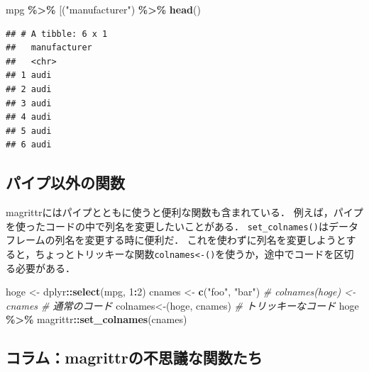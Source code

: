 \documentclass[
]{article}
\newenvironment{Shaded}{\begin{snugshade}}{\end{snugshade}}
\newcommand{\AttributeTok}[1]{\textcolor[rgb]{0.13,0.29,0.53}{#1}}
\newcommand{\CommentTok}[1]{\textcolor[rgb]{0.56,0.35,0.01}{\textit{#1}}}
\newcommand{\DecValTok}[1]{\textcolor[rgb]{0.00,0.00,0.81}{#1}}
\newcommand{\FunctionTok}[1]{\textcolor[rgb]{0.13,0.29,0.53}{\textbf{#1}}}
\newcommand{\NormalTok}[1]{#1}
\newcommand{\OtherTok}[1]{\textcolor[rgb]{0.56,0.35,0.01}{#1}}
\newcommand{\SpecialCharTok}[1]{\textcolor[rgb]{0.81,0.36,0.00}{\textbf{#1}}}
\newcommand{\StringTok}[1]{\textcolor[rgb]{0.31,0.60,0.02}{#1}}
\begin{document}
\begin{Shaded}
\begin{Highlighting}[]
\NormalTok{mpg }\SpecialCharTok{\%\textgreater{}\%} \StringTok{\textasciigrave{}}\AttributeTok{[}\StringTok{\textasciigrave{}}\NormalTok{(}\StringTok{"manufacturer"}\NormalTok{)  }\SpecialCharTok{\%\textgreater{}\%} \FunctionTok{head}\NormalTok{()}
\end{Highlighting}
\end{Shaded}

\begin{verbatim}
## # A tibble: 6 x 1
##   manufacturer
##   <chr>       
## 1 audi        
## 2 audi        
## 3 audi        
## 4 audi        
## 5 audi        
## 6 audi
\end{verbatim}

\hypertarget{ux30d1ux30a4ux30d7ux4ee5ux5916ux306eux95a2ux6570}{%
\subsection{パイプ以外の関数}\label{ux30d1ux30a4ux30d7ux4ee5ux5916ux306eux95a2ux6570}}

magrittrにはパイプとともに使うと便利な関数も含まれている．
例えば，パイプを使ったコードの中で列名を変更したいことがある．
\texttt{set\_colnames()}はデータフレームの列名を変更する時に便利だ．
これを使わずに列名を変更しようとすると，ちょっとトリッキーな関数\texttt{colnames\textless{}-()}を使うか，途中でコードを区切る必要がある．

\begin{Shaded}
\begin{Highlighting}[]
\NormalTok{hoge }\OtherTok{\textless{}{-}}\NormalTok{ dplyr}\SpecialCharTok{::}\FunctionTok{select}\NormalTok{(mpg, }\DecValTok{1}\SpecialCharTok{:}\DecValTok{2}\NormalTok{)}
\NormalTok{cnames }\OtherTok{\textless{}{-}} \FunctionTok{c}\NormalTok{(}\StringTok{"foo"}\NormalTok{, }\StringTok{"bar"}\NormalTok{)}
 \CommentTok{\# colnames(hoge) \textless{}{-} cnames      \# 通常のコード}
\StringTok{\textasciigrave{}}\AttributeTok{colnames\textless{}{-}}\StringTok{\textasciigrave{}}\NormalTok{(hoge, cnames)       }\CommentTok{\# トリッキーなコード}
\NormalTok{hoge }\SpecialCharTok{\%\textgreater{}\%} 
\NormalTok{  magrittr}\SpecialCharTok{::}\FunctionTok{set\_colnames}\NormalTok{(cnames)}
\end{Highlighting}
\end{Shaded}

\hypertarget{ux30b3ux30e9ux30e0magrittrux306eux4e0dux601dux8b70ux306aux95a2ux6570ux305fux3061}{%
\subsection{コラム：magrittrの不思議な関数たち}\label{ux30b3ux30e9ux30e0magrittrux306eux4e0dux601dux8b70ux306aux95a2ux6570ux305fux3061}}
\end{document}
